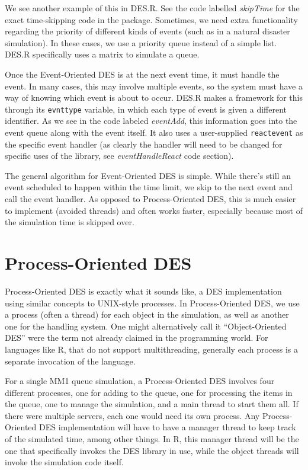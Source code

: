 \documentclass[a4paper, 11pt]{article} %
\begin{document}
We see another example of this in DES.R. See the code labelled \textit{skipTime} for the exact time-skipping code in the package. Sometimes, we need extra functionality regarding the priority of different kinds of events (such as in a natural disaster simulation). In these cases, we use a priority queue instead of a simple list. DES.R specifically uses a matrix to simulate a queue.

Once the Event-Oriented DES is at the next event time, it must handle the event. In many cases, this may involve multiple events, so the system must have a way of knowing which event is about to occur. DES.R makes a framework for this through its \texttt{evnttype} variable, in which each type of event is given a different identifier. As we see in the code labeled \textit{eventAdd}, this information goes into the event queue along with the event itself. It also uses a user-supplied \texttt{reactevent} as the specific event handler (as clearly the handler will need to be changed for specific uses of the library, see \textit{eventHandleReact} code section).

The general algorithm for Event-Oriented DES is simple. While there's still an event scheduled to happen within the time limit, we skip to the next event and call the event handler. As opposed to Process-Oriented DES, this is much easier to implement (avoided threads) and often works faster, especially because most of the simulation time is skipped over. \newline




\section{Process-Oriented DES}

Process-Oriented DES is exactly what it sounds like, a DES implementation using similar concepts to UNIX-style processes. In Process-Oriented DES, we use a process (often a thread) for each object in the simulation, as well as another one for the handling system. One might alternatively call it “Object-Oriented DES” were the term not already claimed in the programming world. For languages like R, that do not support multithreading, generally each process is a separate invocation of the language.

For a single MM1 queue simulation, a Process-Oriented DES involves four different processes, one for adding to the queue, one for processing the items in the queue, one to manage the simulation, and a main thread to start them all. If there were multiple servers, each one would need its own process. Any Process-Oriented DES implementation will have to have a manager thread to keep track of the simulated time, among other things. In R, this manager thread will be the one that specifically invokes the DES library in use, while the object threads will invoke the simulation code itself.
\end{document}
